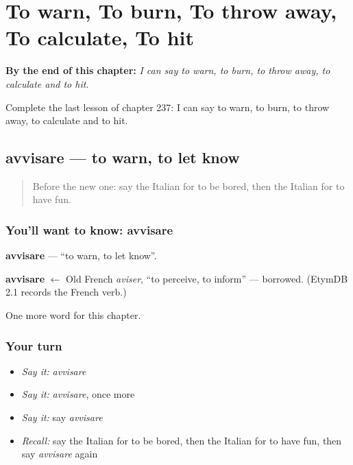 
\chapter{To warn, To burn, To throw away, To calculate, To hit}
\label{ch:it-to-warn-to-burn-to-throw-away-to-calculate-to-hit}

\begin{chapteropening}
\textbf{By the end of this chapter:} \emph{I can say to warn, to burn, to throw away, to calculate and to hit.}

Complete the last lesson of chapter 237: I can say to warn, to burn, to throw away, to calculate and to hit.
\end{chapteropening}

\section[avvisare]{avvisare — to warn, to let know}

\label{lesson:IT-C237-avvisare}



\begin{quote}
Before the new one: say the Italian for to be bored, then the Italian for to have fun.
\end{quote}

\subsection*{You'll want to know: avvisare}
\textbf{avvisare} — \textquotedblleft{}to warn, to let know\textquotedblright{}.

\begin{cousinweb}
\textbf{avvisare} $\leftarrow$ Old French \emph{aviser}, \textquotedblleft{}to perceive, to inform\textquotedblright{} — borrowed. (EtymDB 2.1 records the French verb.)
\end{cousinweb}

\begin{grammarlens}[title={What you've built}]
One more word for this chapter.
\end{grammarlens}

\subsection*{Your turn}
\begin{itemize}
\raggedright
  \item \emph{Say it:} \emph{avvisare}
  \item \emph{Say it:} \emph{avvisare}, once more
  \item \emph{Say it:} say \emph{avvisare}
  \item \emph{Recall:} say the Italian for to be bored, then the Italian for to have fun, then say \emph{avvisare} again
\end{itemize}

